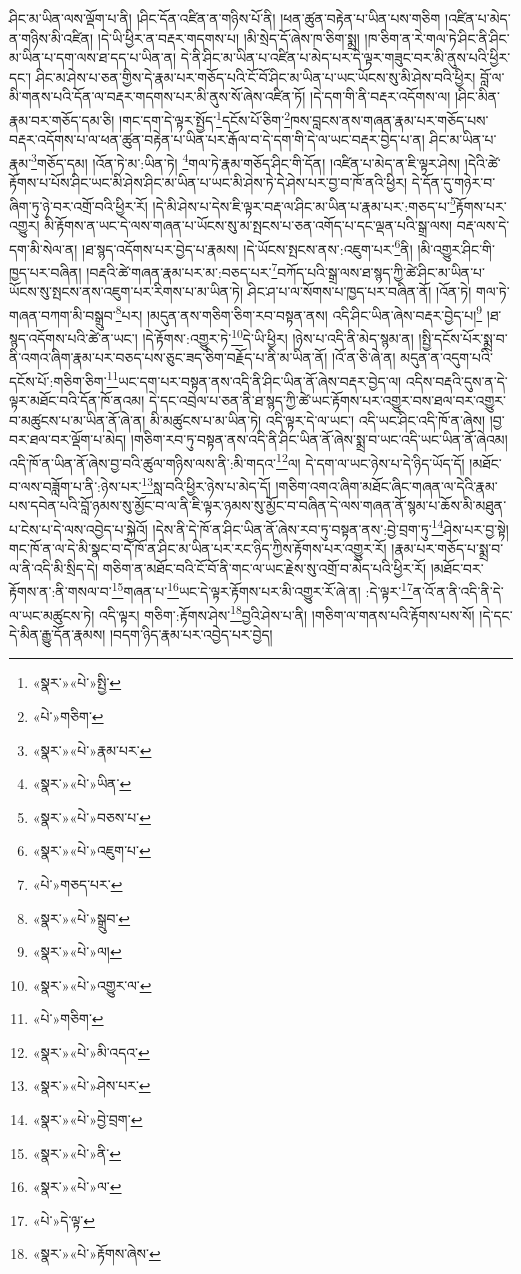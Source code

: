 ཤིང་མ་ཡིན་ལས་ལྡོག་པ་ནི། །ཤིང་དོན་འཛིན་ན་གཉིས་པོ་ནི། །ཕན་ཚུན་བརྟེན་པ་ཡིན་པས་གཅིག །འཛིན་པ་མེད་ན་གཉིས་མི་འཛིན། །དེ་ཡི་ཕྱིར་ན་བརྡར་གདགས་པ། །མི་སྲེད་དོ་ཞེས་ཁ་ཅིག་སྨྲ། །ཁ་ཅིག་ན་རེ་གལ་ཏེ་ཤིང་ནི་ཤིང་མ་ཡིན་པ་དག་ལས་ཐ་དད་པ་ཡིན་ན། དེ་ནི་ཤིང་མ་ཡིན་པ་འཛིན་པ་མེད་པར་དེ་ལྟར་གཟུང་བར་མི་ནུས་པའི་ཕྱིར་དང་། ཤིང་མ་ཤེས་པ་ཅན་གྱིས་དེ་རྣམ་པར་གཅོད་པའི་ངོ་བོ་ཤིང་མ་ཡིན་པ་ཡང་ཡོངས་སུ་མི་ཤེས་བའི་ཕྱིར། བློ་ལ་མི་གནས་པའི་དོན་ལ་བརྡར་གདགས་པར་མི་ནུས་སོ་ཞེས་འཛིན་ཏོ། །དེ་དག་གི་ནི་བརྡར་འདོགས་ལ། །ཤིང་མིན་རྣམ་བར་གཅོད་དམ་ཅི། །གང་དག་དེ་ལྟར་སྤྱོད་\footnote{«སྣར་»«པེ་»སྤྱི་}དངོས་པོ་ཅིག་\footnote{«པེ་»གཅིག་}ཁས་བླངས་ནས་གཞན་རྣམ་པར་གཅོད་པས་བརྡར་འདོགས་པ་ལ་ཕན་ཚུན་བརྟེན་པ་ཡིན་པར་རྒོལ་བ་དེ་དག་གི་དེ་ལ་ཡང་བརྡར་བྱེད་པ་ན། ཤིང་མ་ཡིན་པ་རྣམ་\footnote{«སྣར་»«པེ་»རྣམ་པར་}གཅོད་དམ། །འོན་ཏེ་མ་:ཡིན་ཏེ། \footnote{«སྣར་»«པེ་»ཡིན་}གལ་ཏེ་རྣམ་གཅོད་ཤིང་གི་དོན། །འཛིན་པ་མེད་ན་ཇི་ལྟར་ཤེས། །དེའི་ཚེ་རྟོགས་པ་པོས་ཤིང་ཡང་མི་ཤེས་ཤིང་མ་ཡིན་པ་ཡང་མི་ཤེས་ཏེ་དེ་ཤེས་པར་བྱ་བ་ཁོ་ནའི་ཕྱིར། དེ་དོན་དུ་གཉེར་བ་ཞིག་ཏུ་ཉེ་བར་འགྲོ་བའི་ཕྱིར་རོ། །དེ་མི་ཤེས་པ་དེས་ཇི་ལྟར་བརྡ་ལ་ཤིང་མ་ཡིན་པ་རྣམ་པར་:གཅད་པ་\footnote{«སྣར་»«པེ་»བཅས་པ་}རྟོགས་པར་འགྱུར། མི་རྟོགས་ན་ཡང་དེ་ལས་གཞན་པ་ཡོངས་སུ་མ་སྤངས་པ་ཅན་འགོད་པ་དང་ལྡན་པའི་སྒྲ་ལས། བརྡ་ལས་དེ་དག་མི་སེལ་ན། །ཐ་སྙད་འདོགས་པར་བྱེད་པ་རྣམས། །དེ་ཡོངས་སྤངས་ནས་:འཇུག་པར་\footnote{«སྣར་»«པེ་»འཇུག་པ་}ནི། །མི་འགྱུར་ཤིང་གི་ཁྱད་པར་བཞིན། །བརྡའི་ཚེ་གཞན་རྣམ་པར་མ་:བཅད་པར་\footnote{«པེ་»གཅད་པར་}བཀོད་པའི་སྒྲ་ལས་ཐ་སྙད་ཀྱི་ཚེ་ཤིང་མ་ཡིན་པ་ཡོངས་སུ་སྤངས་ནས་འཇུག་པར་རིགས་པ་མ་ཡིན་ཏེ། ཤིང་ཤ་པ་ལ་སོགས་པ་ཁྱད་པར་བཞིན་ནོ། །འོན་ཏེ། གལ་ཏེ་གཞན་བཀག་མི་བསྒྲུབ་\footnote{«སྣར་»«པེ་»སྒྲུབ་}པར། །མདུན་ནས་གཅིག་ཅིག་རབ་བསྟན་ནས། འདི་ཤིང་ཡིན་ཞེས་བརྡར་བྱེད་པ།\footnote{«སྣར་»«པེ་»ལ།} །ཐ་སྙད་འདོགས་པའི་ཚེ་ན་ཡང་། །དེ་རྟོགས་:འགྱུར་ཏེ་\footnote{«སྣར་»«པེ་»འགྱུར་ལ་}དེ་ཡི་ཕྱིར། །ཉེས་པ་འདི་ནི་མེད་སྙམ་ན། །སྤྱི་དངོས་པོར་སྨྲ་བ་ནི་འགའ་ཞིག་རྣམ་པར་བཅད་པས་ཅུང་ཟད་ཅིག་བརྗོད་པ་ནི་མ་ཡིན་ནོ། །འོ་ན་ཅི་ཞེ་ན། མདུན་ན་འདུག་པའི་དངོས་པོ་:གཅིག་ཅིག་\footnote{«པེ་»གཅིག་}ཡང་དག་པར་བསྟན་ནས་འདི་ནི་ཤིང་ཡིན་ནོ་ཞེས་བརྡར་བྱེད་ལ། འདིས་བརྡའི་དུས་ན་དེ་ལྟར་མཐོང་བའི་དོན་ཁོ་ནའམ། དེ་དང་འབྲེལ་པ་ཅན་ནི་ཐ་སྙད་ཀྱི་ཚེ་ཡང་རྟོགས་པར་འགྱུར་བས་ཐལ་བར་འགྱུར་བ་མཚུངས་པ་མ་ཡིན་ནོ་ཞེ་ན། མི་མཚུངས་པ་མ་ཡིན་ཏེ། འདི་ལྟར་དེ་ལ་ཡང་། འདི་ཡང་ཤིང་འདི་ཁོ་ན་ཞེས། །བྱ་བར་ཐལ་བར་ལྡོག་པ་མེད། །གཅིག་རབ་ཏུ་བསྟན་ནས་འདི་ནི་ཤིང་ཡིན་ནོ་ཞེས་སྨྲ་བ་ཡང་འདི་ཡང་ཡིན་ནོ་ཞེའམ། འདི་ཁོ་ན་ཡིན་ནོ་ཞེས་བྱ་བའི་ཚུལ་གཉིས་ལས་ནི་:མི་གདའ་\footnote{«སྣར་»«པེ་»མི་འདའ་}ལ། དེ་དག་ལ་ཡང་ཉེས་པ་དེ་ཉིད་ཡོད་དོ། །མཐོང་བ་ལས་བཟློག་པ་ནི་:ཉེས་པར་\footnote{«སྣར་»«པེ་»ཤེས་པར་}སླ་བའི་ཕྱིར་ཉེས་པ་མེད་དོ། །གཅིག་འགའ་ཞིག་མཐོང་ཞིང་གཞན་ལ་དེའི་རྣམ་པས་དབེན་པའི་བློ་ཉམས་སུ་མྱོང་བ་ལ་ནི་ཇི་ལྟར་ཉམས་སུ་མྱོང་བ་བཞིན་དེ་ལས་གཞན་ནོ་སྙམ་པ་ཆོས་མི་མཐུན་པ་ངེས་པ་དེ་ལས་འབྱེད་པ་སྐྱེའོ། །དེས་ནི་དེ་ཁོ་ན་ཤིང་ཡིན་ནོ་ཞེས་རབ་ཏུ་བསྟན་ནས་:བྱེ་བྲག་ཏུ་\footnote{«སྣར་»«པེ་»བྱེ་བྲག་}ཤེས་པར་བྱ་སྟེ། གང་ཁོ་ན་ལ་དེ་མི་སྣང་བ་དེ་ཁོ་ན་ཤིང་མ་ཡིན་པར་རང་ཉིད་ཀྱིས་རྟོགས་པར་འགྱུར་རོ། །རྣམ་པར་གཅོད་པ་སྨྲ་བ་ལ་ནི་འདི་མི་སྲིད་དེ། གཅིག་ན་མཐོང་བའི་ངོ་བོ་ནི་གང་ལ་ཡང་རྗེས་སུ་འགྲོ་བ་མེད་པའི་ཕྱིར་རོ། །མཐོང་བར་རྟོགས་ན་:ནི་གསལ་བ་\footnote{«སྣར་»«པེ་»ནི་}གཞན་པ་\footnote{«སྣར་»«པེ་»ལ་}ཡང་དེ་ལྟར་རྟོགས་པར་མི་འགྱུར་རོ་ཞེ་ན། :དེ་ལྟར་\footnote{«པེ་»དེ་ལྟ་}ན་འོ་ན་ནི་འདི་ནི་དེ་ལ་ཡང་མཚུངས་ཏེ། འདི་ལྟར། གཅིག་:རྟོགས་ཤེས་\footnote{«སྣར་»«པེ་»རྟོགས་ཞེས་}བྱའི་ཤེས་པ་ནི། །གཅིག་ལ་གནས་པའི་རྟོགས་པས་སོ། །དེ་དང་དེ་མིན་རྒྱུ་དོན་རྣམས། །བདག་ཉིད་རྣམ་པར་འབྱེད་པར་བྱེད། 